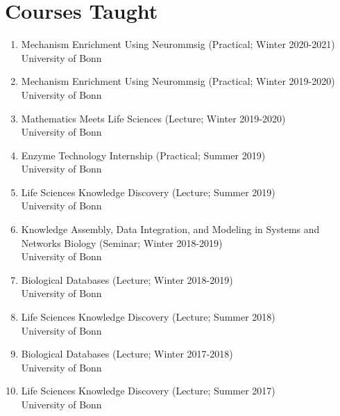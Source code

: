 \documentclass[10pt,a4paper,sans]{moderncv} %
\begin{document}
    \section{Courses Taught}
    \begin{enumerate}
    \itemsep0.5em
        \item     Mechanism Enrichment Using Neurommsig (Practical; Winter 2020-2021)\\
    {\scriptsize University of Bonn}

        \item     Mechanism Enrichment Using Neurommsig (Practical; Winter 2019-2020)\\
    {\scriptsize University of Bonn}

        \item     Mathematics Meets Life Sciences (Lecture; Winter 2019-2020)\\
    {\scriptsize University of Bonn}

        \item     Enzyme Technology Internship (Practical; Summer 2019)\\
    {\scriptsize University of Bonn}

        \item     Life Sciences Knowledge Discovery (Lecture; Summer 2019)\\
    {\scriptsize University of Bonn}

        \item     Knowledge Assembly, Data Integration, and Modeling in Systems and Networks Biology (Seminar; Winter 2018-2019)\\
    {\scriptsize University of Bonn}

        \item     Biological Databases (Lecture; Winter 2018-2019)\\
    {\scriptsize University of Bonn}

        \item     Life Sciences Knowledge Discovery (Lecture; Summer 2018)\\
    {\scriptsize University of Bonn}

        \item     Biological Databases (Lecture; Winter 2017-2018)\\
    {\scriptsize University of Bonn}

        \item     Life Sciences Knowledge Discovery (Lecture; Summer 2017)\\
    {\scriptsize University of Bonn}


\end{enumerate}
\end{document}
